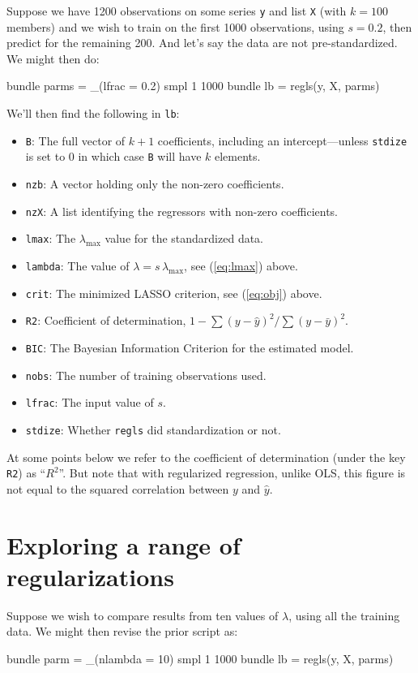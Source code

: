 \documentclass{article}
\begin{document}
Suppose we have 1200 observations on some series \texttt{y} and list
\texttt{X} (with $k=100$ members) and we wish to train on the first
1000 observations, using $s = 0.2$, then predict for the remaining
200. And let's say the data are not pre-standardized. We might then
do:
\begin{code}
bundle parms = _(lfrac = 0.2)
smpl 1 1000
bundle lb = regls(y, X, parms)
\end{code}
We'll then find the following in \texttt{lb}:
\begin{itemize}
\item \texttt{B}: The full vector of $k+1$ coefficients, including an
  intercept---unless \texttt{stdize} is set to 0 in which case
  \texttt{B} will have $k$ elements.
\item \texttt{nzb}: A vector holding only the non-zero coefficients.
\item \texttt{nzX}: A list identifying the regressors with non-zero
  coefficients.
\item \texttt{lmax}: The $\lambda_{\max}$ value for the standardized
  data.
\item \texttt{lambda}: The value of $\lambda = s\,\lambda_{\max}$, see
  (\ref{eq:lmax}) above.
\item \texttt{crit}: The minimized LASSO criterion, see (\ref{eq:obj})
  above.
\item \texttt{R2}: Coefficient of determination,
  $1 - \sum(y-\hat{y})^2/\sum(y-\bar{y})^2$.
\item \texttt{BIC}: The Bayesian Information Criterion for the
  estimated model.
\item \texttt{nobs}: The number of training observations used.
\item \texttt{lfrac}: The input value of $s$.
\item \texttt{stdize}: Whether \texttt{regls} did standardization or
  not.
\end{itemize}

At some points below we refer to the coefficient of determination
(under the key \texttt{R2}) as ``$R^2$''. But note that with
regularized regression, unlike OLS, this figure is not equal to the
squared correlation between $y$ and $\hat{y}$.

\section{Exploring a range of regularizations}
\label{sec:simple-search}

Suppose we wish to compare results from ten values of $\lambda$,
using all the training data. We might then revise the prior script as:
\begin{code}
bundle parm = _(nlambda = 10)
smpl 1 1000
bundle lb = regls(y, X, parms)
\end{code}
\end{document}
